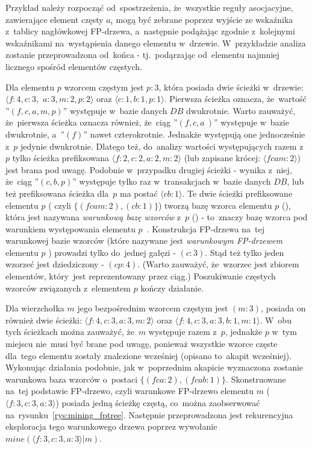 Przykład należy rozpocząć od~spostrzeżenia, że~wszystkie reguły asocjacyjne, zawierające element częsty $a_i$ mogą być zebrane poprzez wyjście ze wskaźnika z~tablicy nagłówkowej FP-drzewa, a~następnie podążając zgodnie z~kolejnymi wskaźnikami na~wystąpienia danego elementu w~drzewie. W~przykładzie analiza zostanie przeprowadzona od~końca - tj.~podąrzając od~elementu najmniej licznego spośród elementów częstych.

Dla elementu $p$ wzorcem częstym jest $p: 3$, która posiada dwie ścieżki w~drzewie: $\langle f: 4, c: 3,$ $a: 3, m: 2, p: 2\rangle$ oraz $\langle c: 1, b: 1, p: 1\rangle$. Pierwsza ścieżka oznacza, że~wartość ''$( f, c, a, m, p )$'' występuje w~bazie danych $DB$ dwukrotnie. Warto zauważyć, że~pierwsza ścieżka oznacza również, że~ciąg ''$( f, c, a~)$'' występuje w~bazie dwukrotnie, a~''$(f)$'' nawet czterokrotnie. Jednakże występują one jednocześnie z~$p$ jedynie dwukrotnie. Dlatego też, do~analizy wartości występujących razem z~$p$ tylko ścieżka prefiksowana $\langle f: 2, c: 2, a: 2, m: 2\rangle$ (lub zapisane krócej: $\langle fcam: 2\rangle$) jest brana pod uwagę. Podobnie w~przypadku drugiej ścieżki - wynika z~niej, że~ciąg ''$(c, b, p)$'' występuje tylko raz w~transakcjach w~bazie danych $DB$, lub też prefiksowana ścieżka dla~$p$ ma postać $\langle cb: 1 \rangle$. Te dwie ścieżki prefiksowane elementu $p$ ( czyli $\lbrace ( fcam: 2 ), (cb: 1) \rbrace$) tworzą bazę wzorca elementu $p$ (), która jest nazywana \emph{warunkową bazę wzorców} z~$p$ () - to~znaczy bazę wzorca pod warunkiem występowania elementu $p$~\cite{Main:FPgrowth}. Konstrukcja FP-drzewa na~tej warunkowej bazie wzorców (które nazywane jest \emph{warunkowym FP-drzewem} elementu $p$ ) prowadzi tylko do~jednej gałęzi - $(c:3)$. Stąd też tylko jeden wzorzeć jest dziedziczony - $(cp:4)$. (Warto zauważyć, że~wzorzec jest zbiorem elementów, który~jest reprezentowany przez ciąg.) Poszukiwanie częstych wzorców związanych z~elementem $p$ kończy działanie.

Dla wierzchołka $m$ jego bezpośrednim wzorcem częstym jest $(m:3)$, posiada on również dwie ścieżki: $\langle f: 4, c: 3, a: 3, m: 2 \rangle$ oraz $\langle f: 4, c: 3, a: 3, b: 1, m: 1 \rangle$. W~obu tych ścieżkach można zauważyć, że~$m$ występuje razem z~$p$, jednakże $p$ w~tym miejscu nie~musi być brane pod uwagę, ponieważ wszystkie wzorce częste dla~tego elementu zostały znalezione wcześniej (opisano to~akapit wcześniej). Wykonując działania podobnie, jak w~poprzednim akapicie wyznaczona zostanie warunkowa baza wzorców o~postaci $\lbrace (fca: 2), (fcab: 1) \rbrace$. Skonstruowane na~tej podstawie FP-drzewo, czyli warunkowe FP-drzewo elementu $m$ ($\langle f: 3, c: 3, a: 3 \rangle$) posiada jedną ścieżkę częstą, co~można zaobserwować na~rysunku~\ref{rys:mining_fptree}. Następnie przeprowadzona jest rekurencyjna eksploracja tego warunkowego drzewa poprzez wywołanie $mine(\langle f: 3, c: 3, a: 3 \rangle | m)$.

